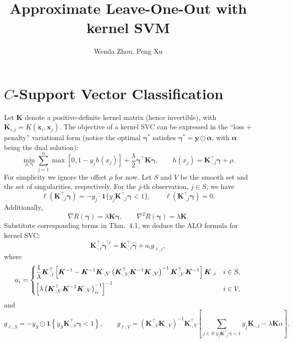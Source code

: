 \documentclass[11pt]{article}
\title{Approximate Leave-One-Out with kernel SVM}
\author{Wenda Zhou, Peng Xu}
\newcommand{\bx}{\bm{x}}
\newcommand{\by}{\bm{y}}
\newcommand{\bK}{\bm{K}}
\newcommand{\balpha}{\bm{\alpha}}
\newcommand{\bgamma}{\bm{\gamma}}
\newcommand{\refthm}[2]{#1~#2}
\begin{document}
\maketitle

\section{\(C\)-Support Vector Classification}
Let \(\bK\) denote a positive-definite kernel matrix (hence invertible), with \(\bK_{i,j}=K(\bx_i,\bx_j)\). The objective of a kernel SVC can be expressed in the ``loss \(+\) penalty'' variational form (notice the optimal \(\bgamma^\ast\) satisfies \(\bgamma^\ast=\by\odot\balpha\), with \(\balpha\) being the dual solution):
\begin{equation}
\min_{\rho,\bgamma}\sum_{j=1}^{n}\max\left[0, 1-y_jh(x_j)\right]+\frac{\lambda}{2}\bgamma^\top\bK\bgamma, \qquad h(x_j)=\bK_{\cdot,j}^\top\bgamma+\rho.
\end{equation}
For simplicity we ignore the offset \(\rho\) for now. Let \(S\) and \(V\) be the smooth set and the set of singularities, respectively. For the \(j\)-th observation, \(j\in S\), we have \[\dot{\ell}(\bK_{\cdot,j}^\top\bgamma)=-y_j\cdot\bm{1}\{y_j\bK_{\cdot,j}^\top\bgamma<1\},\qquad\ddot{\ell}(\bK_{\cdot,j}^\top\bgamma)=0.\] Additionally, \[\nabla R(\bgamma)=\lambda\bK\bgamma,\qquad\nabla^2R(\bgamma)=\lambda\bK.\] Substitute corresponding terms in \refthm{Thm.}{4.1}, we deduce the ALO formula for kernel SVC: \[\bK_{\cdot,i}^\top\tilde{\bgamma}^{\setminus i}=\bK_{\cdot,i}^\top\hat{\bgamma}+a_ig_{\ell,i},\] where \[a_i=\begin{dcases}
\frac{1}{\lambda}\bK_{\cdot,i}^\top\left[\bK^{-1}-\bK^{-1}\bK_{\cdot,V}\left(\bK_{\cdot,V}^\top\bK^{-1}\bK_{\cdot,V}\right)^{-1}\bK_{\cdot,V}^\top\bK^{-1}\right]\bK_{\cdot,i} & i\in S,\\
\left[\lambda\left(\bK_{\cdot,V}^\top\bK^{-1}\bK_{\cdot,V}\right)^{-1}_{ii}\right]^{-1} & i\in V,
\end{dcases}\] and \[g_{\ell, S}=-y_S\odot\bm{1}\left\{y_S\bK_{\cdot,S}^\top\bgamma<1\right\},\qquad g_{\ell, V}=\left(\bK_{\cdot,V}^\top\bK_{\cdot,V}\right)^{-1}\bK_{\cdot,V}^\top\left[\sum_{j\in S:y_j\bK_{\cdot,j}^\top\bgamma<1}y_j\bK_{\cdot,j}-\lambda\bK\alpha\right].\]
\end{document}

